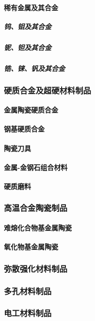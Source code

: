 \documentclass[UTF8]{../../ApplicationUniverse}
\begin{document}
            \paragraph{稀有金属及其合金}
                \subparagraph{钨、钼及其合金}
                \subparagraph{铌、钽及其合金}
                \subparagraph{锆、铼、钒及其合金}
        \subsubsection{硬质合金及超硬材料制品}
            \paragraph{金属陶瓷硬质合金}
            \paragraph{钢基硬质合金}
            \paragraph{陶瓷刀具}
            \paragraph{金属-金钢石组合材料}
            \paragraph{硬质磨料}
        \subsubsection{高温合金陶瓷制品}
            \paragraph{难熔化合物基金属陶瓷}
            \paragraph{氧化物基金属陶瓷}
        \subsubsection{弥散强化材料制品}
        \subsubsection{多孔材料制品}
        \subsubsection{电工材料制品}
\end{document}
